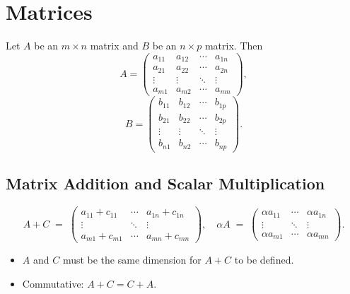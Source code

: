 \section{Matrices}
Let $A$ be an $m \times n$ matrix and $B$ be an $n \times p$ matrix. Then
\[
A =
\begin{pmatrix}
a_{11} & a_{12} & \cdots & a_{1n} \\
a_{21} & a_{22} & \cdots & a_{2n} \\
\vdots & \vdots & \ddots & \vdots \\
a_{m1} & a_{m2} & \cdots & a_{mn}
\end{pmatrix},
\]
\[
B =
\begin{pmatrix}
b_{11} & b_{12} & \cdots & b_{1p} \\
b_{21} & b_{22} & \cdots & b_{2p} \\
\vdots & \vdots & \ddots & \vdots \\
b_{n1} & b_{n2} & \cdots & b_{np}
\end{pmatrix}.
\]

\subsection{Matrix Addition and Scalar Multiplication}
\[
A + C \;=\;
\begin{pmatrix}
a_{11} + c_{11} & \cdots & a_{1n} + c_{1n} \\
\vdots & \ddots & \vdots \\
a_{m1} + c_{m1} & \cdots & a_{mn} + c_{mn}
\end{pmatrix},
\quad
\alpha A \;=\;
\begin{pmatrix}
\alpha a_{11} & \cdots & \alpha a_{1n} \\
\vdots & \ddots & \vdots \\
\alpha a_{m1} & \cdots & \alpha a_{mn}
\end{pmatrix}.
\]
\begin{itemize}
\item $A$ and $C$ must be the same dimension for $A + C$ to be defined.
\item Commutative: $A + C = C + A$.
\end{itemize}

